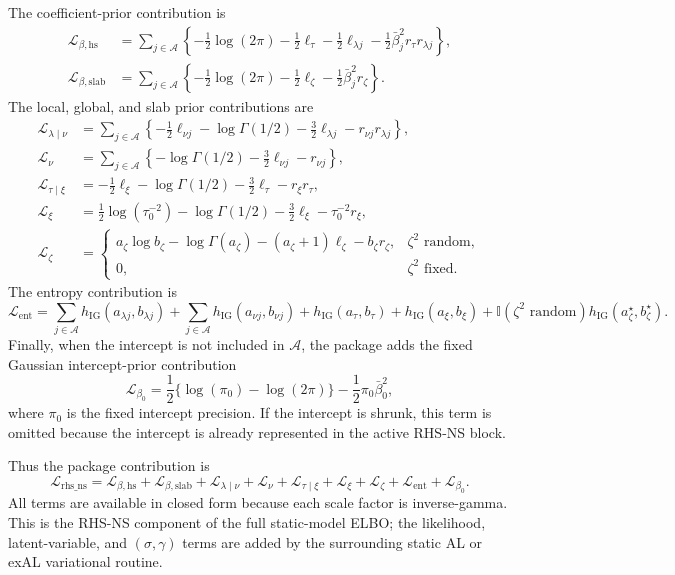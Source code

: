 \documentclass[nojss,noheadings]{jss}
\newcommand{\Ind}{\mathbb{I}}
\newcommand{\IG}{\operatorname{IG}}
\newcommand{\elbo}{\mathcal{L}}
\begin{document}
The coefficient-prior contribution is
\begin{align}
\elbo_{\beta,\mathrm{hs}}
&=
\sum_{j\in\mathcal{A}}
\left\{
-\frac12\log(2\pi)
-\frac12\ell_\tau
-\frac12\ell_{\lambda j}
-\frac12\bar\beta_j^2 r_\tau r_{\lambda j}
\right\},\\
\elbo_{\beta,\mathrm{slab}}
&=
\sum_{j\in\mathcal{A}}
\left\{
-\frac12\log(2\pi)
-\frac12\ell_\zeta
-\frac12\bar\beta_j^2 r_\zeta
\right\}.
\end{align}
The local, global, and slab prior contributions are
\begin{align}
\elbo_{\lambda\mid\nu}
&=
\sum_{j\in\mathcal{A}}
\left\{
-\frac12\ell_{\nu j}
-\log\Gamma(1/2)
-\frac32\ell_{\lambda j}
-r_{\nu j}r_{\lambda j}
\right\},\\
\elbo_{\nu}
&=
\sum_{j\in\mathcal{A}}
\left\{
-\log\Gamma(1/2)
-\frac32\ell_{\nu j}
-r_{\nu j}
\right\},\\
\elbo_{\tau\mid\xi}
&=
-\frac12\ell_\xi
-\log\Gamma(1/2)
-\frac32\ell_\tau
-r_\xi r_\tau,\\
\elbo_{\xi}
&=
\frac12\log(\tau_0^{-2})
-\log\Gamma(1/2)
-\frac32\ell_\xi
-\tau_0^{-2}r_\xi,\\
\elbo_{\zeta}
&=
\begin{cases}
a_\zeta\log b_\zeta-\log\Gamma(a_\zeta)
-(a_\zeta+1)\ell_\zeta-b_\zeta r_\zeta,
& \zeta^2\text{ random},\\
0, & \zeta^2\text{ fixed}.
\end{cases}
\end{align}
The entropy contribution is
\begin{equation}
\elbo_{\mathrm{ent}}
=
\sum_{j\in\mathcal{A}} h_{\IG}(a_{\lambda j},b_{\lambda j})
+\sum_{j\in\mathcal{A}} h_{\IG}(a_{\nu j},b_{\nu j})
+h_{\IG}(a_\tau,b_\tau)
+h_{\IG}(a_\xi,b_\xi)
+\Ind(\zeta^2\text{ random})h_{\IG}(a_\zeta^\star,b_\zeta^\star).
\end{equation}
Finally, when the intercept is not included in $\mathcal{A}$, the package adds
the fixed Gaussian intercept-prior contribution
\begin{equation}
\elbo_{\beta_0}
=
\frac12\{\log(\pi_0)-\log(2\pi)\}
-\frac12\pi_0\bar\beta_0^2,
\end{equation}
where $\pi_0$ is the fixed intercept precision. If the intercept is shrunk,
this term is omitted because the intercept is already represented in the
active RHS-NS block.

Thus the package contribution is
\begin{equation}
\elbo_{\mathrm{rhs\_ns}}
=
\elbo_{\beta,\mathrm{hs}}
+\elbo_{\beta,\mathrm{slab}}
+\elbo_{\lambda\mid\nu}
+\elbo_{\nu}
+\elbo_{\tau\mid\xi}
+\elbo_{\xi}
+\elbo_{\zeta}
+\elbo_{\mathrm{ent}}
+\elbo_{\beta_0}.
\label{eq:rhs_ns_elbo}
\end{equation}
All terms are available in closed form because each scale factor is
inverse-gamma. This is the RHS-NS component of the full static-model ELBO; the
likelihood, latent-variable, and $(\sigma,\gamma)$ terms are added by the
surrounding static AL or exAL variational routine.
\end{document}
